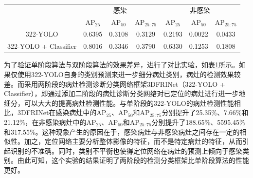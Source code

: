 \begin{table}[htbp]
  \centering
  \begin{tabular}{ccccccc}
    \toprule
                          & \multicolumn{3}{c}{感染} & \multicolumn{3}{c}{非感染}                                                               \\
                          & AP\(_{25}\)              & AP\(_{50}\)                & AP\(_{25:75}\) & AP\(_{25}\) & AP\(_{50}\) & AP\(_{25:75}\) \\
    \midrule
    322-YOLO              & 0.6395                   & 0.3108                     & 0.3129         & 0.2193      & 0.0022      & 0.0433         \\
    322-YOLO + Classifier & 0.8016                   & 0.3346                     & 0.3790         & 0.6330      & 0.1253      & 0.1808         \\
    \bottomrule
  \end{tabular}
  \label{tab:chao04_experiment_1vs2}
\end{table}

为了验证单阶段算法与双阶段算法的效果差异，进行了对比实验，如表\ref{tab:chao04_experiment_1vs2}所示。如果仅使用322-YOLO自身的类别预测来进一步细分病灶类别，病灶的检测效果较差。而采用两阶段的病灶检测诊断分类网络框架3DFRINet（322-YOLO + Classifier），即通过添加二阶段的病灶诊断分类网络对已定位的病灶进行进一步地细分，可以大大的提高病灶检测性能。与单阶段的322-YOLO的病灶检测性能相比，3DFRINet在感染病灶中的AP\(_{25}\)、AP\(_{50}\)和AP\(_{25:75}\)分别提升了25.35\%、7.66\%和21.12\%，在非感染病灶中的AP\(_{25}\)、AP\(_{50}\)和AP\(_{25:75}\)分别提升了188.65\%、5595.45\%和317.55\%。这种现象产生的原因在于，感染病灶与非感染病灶之间存在一定的相似性。加之，定位网络主要分析整体影像的特征，而不是特定病灶的特征，从而引起识别的不准确。同时，类别不平衡也使得定位网络在病灶的预测上倾向于感染类别。由此可知，这个实验的结果证明了两阶段的检测分类框架比单阶段算法的性能更好。


